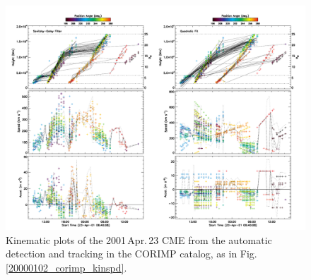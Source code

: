 \documentclass[referee,a4paper,12pt,traditabstract]{swsc}
\begin{document}
\begin{linenumbers}
\begin{figure}[t]
\centerline{\includegraphics[width=\linewidth]{images/20010423_corimp_kinspd.pdf}}
\caption{Kinematic plots of the 2001\,Apr.\,23 CME from the automatic detection and tracking in the CORIMP catalog, as in Fig.\,\ref{20000102_corimp_kinspd}.}
\label{20010423_corimp_kinspd}
\end{figure}



\end{linenumbers}
\end{document}
